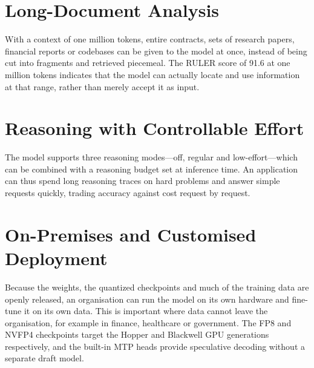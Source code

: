 \section{Long-Document Analysis}

With a context of one million tokens, entire contracts, sets of research
papers, financial reports or codebases can be given to the model at once,
instead of being cut into fragments and retrieved piecemeal. The RULER score
of 91.6 at one million tokens indicates that the model can actually locate and
use information at that range, rather than merely accept it as input.

\section{Reasoning with Controllable Effort}

The model supports three reasoning modes---off, regular and low-effort---which
can be combined with a reasoning budget set at inference time. An application
can thus spend long reasoning traces on hard problems and answer simple
requests quickly, trading accuracy against cost request by request.

\section{On-Premises and Customised Deployment}

Because the weights, the quantized checkpoints and much of the training data
are openly released, an organisation can run the model on its own hardware and
fine-tune it on its own data. This is important where data cannot leave the
organisation, for example in finance, healthcare or government. The FP8 and
NVFP4 checkpoints target the Hopper and Blackwell GPU generations
respectively, and the built-in MTP heads provide speculative decoding without
a separate draft model.
